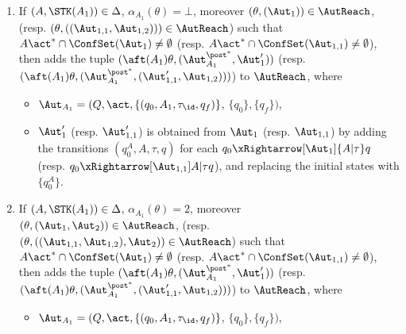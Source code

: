 \smallskip
\fbox
{
\begin{minipage}{0.95\textwidth}
\begin{enumerate}
    \item If $(A,\STK(A_1)) \in\Delta$, $\alpha_{A_1}(\theta) = \bot$, moreover $(\theta, (\Aut_1)) \in \AutReach$, (resp. $(\theta, ((\Aut_{1,1},\Aut_{1,2}))) \in \AutReach$) such that $A\act^*\cap\ConfSet(\Aut_1)\neq \emptyset$ (resp. $A\act^*\cap\ConfSet(\Aut_{1,1})\neq\emptyset$), then adds the tuple $(\aft(A_1)\theta, (\Aut_{A_1}^{\post^*},\Aut_1'))$ (resp. $(\aft(A_1)\theta, (\Aut_{A_1}^{\post^*},(\Aut_{1,1}',\Aut_{1,2})))$) to $\AutReach$, 
        where 
        \begin{itemize}
            \item $\Aut_{A_1} = (Q, \act, \{(q_0, A_1, \tau_{\id}, q_f)\}$, $\{q_0\},\{q_f\})$,
            \item $\Aut_1'$ (resp. $\Aut_{1,1}'$) is obtained from $\Aut_1$ (resp. $\Aut_{1,1}$) by 
                adding the transitions $(q_0^{A},A,\tau,q)$ for each $q_0\xRightarrow[\Aut_1]{A | \tau} q$ (resp. $q_0\xRightarrow[\Aut_{1,1}]{A | \tau} q$), and replacing the initial states with $\{q_0^{A}\}$.
        \end{itemize}
    \item If $(A,\STK(A_1)) \in\Delta$, $\alpha_{A_1}(\theta) = 2$, moreover $(\theta, (\Aut_1,\Aut_2)) \in \AutReach$, (resp. $(\theta, ((\Aut_{1,1},\Aut_{1,2}),\Aut_2)) \in \AutReach$) such that $A\act^*\cap\ConfSet(\Aut_1)\neq \emptyset$ (resp. $A\act^*\cap\ConfSet(\Aut_{1,1})\neq\emptyset$), then adds the tuple $(\aft(A_1)\theta, (\Aut_{A_1}^{\post^*},\Aut_1'))$ (resp. $(\aft(A_1)\theta, (\Aut_{A_1}^{\post^*},(\Aut_{1,1}',\Aut_{1,2})))$) to $\AutReach$, 
        where 
        \begin{itemize}
            \item $\Aut_{A_1} = (Q, \act, \{(q_0, A_1, \tau_{\id}, q_f)\}$, $\{q_0\},\{q_f\})$,

\end{itemize}
\end{enumerate}
\end{minipage}}
